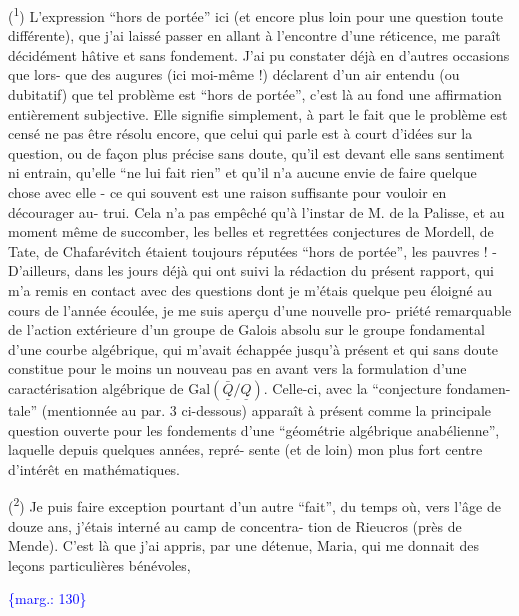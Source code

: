 \documentclass[11pt]{article}
\newcommand{\scanpage}[1]{\par\bigskip\noindent{\small\sffamily[scan #1]}\par}
\newcommand{\mspage}[1]{{\small\sffamily[p.\,#1]}}
\newcommand{\margin}[1]{\textcolor{blue}{\{\textsf{marg.:} #1\}}}
\begin{document}
(\textsuperscript{1}) L'expression ``hors de portée'' ici (et encore plus loin pour
une question toute différente), que j'ai laissé passer en allant
à l'encontre d'une réticence, me paraît décidément hâtive et sans
fondement. J'ai pu constater déjà en d'autres occasions que lors-%
que des augures (ici moi-même !) déclarent d'un air entendu
(ou dubitatif) que tel problème est ``hors de portée'', c'est là
au fond une affirmation entièrement subjective. Elle signifie
simplement, à part le fait que le problème est censé ne pas être
résolu encore, que celui qui parle est à court d'idées sur la
question, ou de façon plus précise sans doute, qu'il est devant
elle sans sentiment ni entrain, qu'elle ``ne lui fait rien'' et
qu'il n'a aucune envie de faire quelque chose avec elle - ce qui
souvent est une raison suffisante pour vouloir en décourager au-%
trui. Cela n'a pas empêché qu'à l'instar de M. de la Palisse, et
au moment même de succomber, les belles et regrettées conjectures
de Mordell, de Tate, de Chafarévitch étaient toujours réputées
``hors de portée'', les pauvres ! - D'ailleurs, dans les jours déjà
qui ont suivi la rédaction du présent rapport, qui m'a remis en
contact avec des questions dont je m'étais quelque peu éloigné au
cours de l'année écoulée, je me suis aperçu d'une nouvelle pro-%
priété remarquable de l'action extérieure d'un groupe de Galois
absolu sur le groupe fondamental d'une courbe algébrique, qui m'avait
échappée jusqu'à présent et qui sans doute constitue pour le moins
un nouveau pas en avant vers la formulation d'une caractérisation
algébrique de $\mathrm{Gal}(\bar{\underline{Q}}/\underline{Q})$. Celle-ci, avec la ``conjecture fondamen-%
tale'' (mentionnée au par. 3 ci-dessous) apparaît à présent comme
la principale question ouverte pour les fondements d'une ``géométrie
algébrique anabélienne'', laquelle depuis quelques années, repré-%
sente (et de loin) mon plus fort centre d'intérêt en mathématiques.

(\textsuperscript{2}) Je puis faire exception pourtant d'un autre ``fait'', du temps
où, vers l'âge de douze ans, j'étais interné au camp de concentra-%
tion de Rieucros (près de Mende). C'est là que j'ai appris, par une
détenue, Maria, qui me donnait des leçons particulières bénévoles,

\margin{130}

\clearpage
\scanpage{119/131}
\mspage{53}
\end{document}
